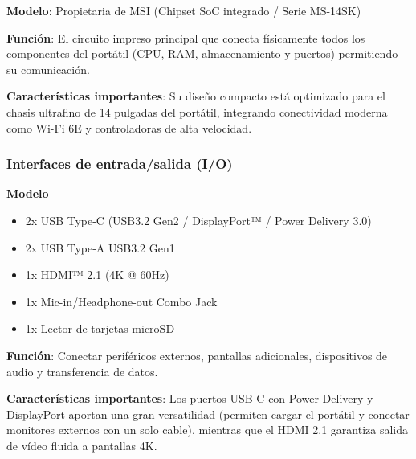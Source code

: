 \documentclass[11.5pt]{article}
\begin{document}
	\textbf{Modelo}: Propietaria de MSI (Chipset SoC integrado / Serie MS-14SK)
	
	\textbf{Función}: El circuito impreso principal que conecta físicamente todos los componentes del portátil (CPU, RAM, almacenamiento y puertos) permitiendo su comunicación.
	
	\textbf{Características importantes}: Su diseño compacto está optimizado para el chasis ultrafino de 14 pulgadas del portátil, integrando conectividad moderna como Wi-Fi 6E y controladoras de alta velocidad.
	\subsubsection*{Interfaces de entrada/salida (I/O)}
	
	\textbf{Modelo}
	
	\begin{itemize}
		\item 2x USB Type-C (USB3.2 Gen2 / DisplayPort™ / Power Delivery 3.0)
		\item 	2x USB Type-A USB3.2 Gen1
		\item 	1x HDMI™ 2.1 (4K @ 60Hz)
		\item 	1x Mic-in/Headphone-out Combo Jack
		\item 	1x Lector de tarjetas microSD
	\end{itemize}
	
	\textbf{Función}: Conectar periféricos externos, pantallas adicionales, dispositivos de audio y transferencia de datos.
	
	\textbf{Características importantes}: Los puertos USB-C con Power Delivery y DisplayPort aportan una gran versatilidad (permiten cargar el portátil y conectar monitores externos con un solo cable), mientras que el HDMI 2.1 garantiza salida de vídeo fluida a pantallas 4K.
	
\end{document}
